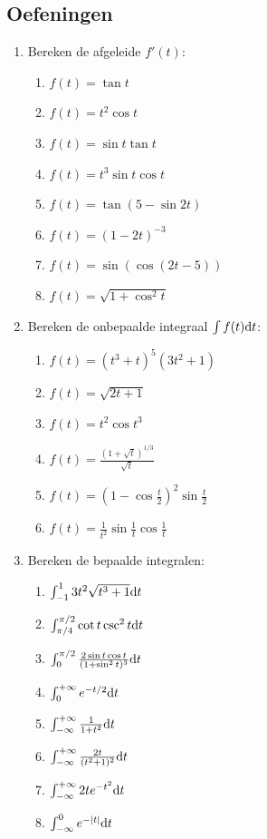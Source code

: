 \subsection{Oefeningen}
\begin{enumerate}
    \item Bereken de afgeleide $f'(t)$:
    \begin{enumerate}
        \item $f(t) = \tan t$
        \item $f(t) = t^2 \cos t$
        \item $f(t) = \sin t \tan t$
        \item $f(t) = t^3 \sin t \cos t$
        \item $f(t) = \tan(5 - \sin 2t)$
        \item $f(t) = (1-2t)^{-3}$
        \item $f(t) = \sin(\cos(2t-5))$
        \item $f(t) = \sqrt{1+\cos^2 t}$
    \end{enumerate}

    \item Bereken de onbepaalde integraal $\int f(t) \mathrm{d} t$:
    \begin{enumerate}
        \item $f(t) = (t^3+t)^5(3t^2+1)$
        \item $f(t) = \sqrt{2t+1}$
        \item $f(t) = t^2 \cos t^3$
        \item $f(t) = \frac{(1+\sqrt{t})^{1/3}}{\sqrt{t}}$
        \item $f(t) = (1-\cos \frac{t}{2})^2 \sin \frac{t}{2}$
        \item $f(t) = \frac{1}{t^2} \sin \frac{1}{t} \cos \frac{1}{t}$
    \end{enumerate}

    \item Bereken de bepaalde integralen:
    \begin{enumerate}
        \item $\int_{-1}^1 3t^2 \sqrt{t^3+1} \mathrm{d} t$
        \item $\int_{\pi/4}^{\pi/2} \cot t \csc^2 t \mathrm{d} t$
        \item $\int_0^{\pi/2} \frac{2\sin t \cos t}{(1+\sin^2 t)^3} \mathrm{d} t$
        \item $\int_0^{+\infty} e^{-t/2} \mathrm{d} t$
        \item $\int_{-\infty}^{+\infty} \frac{1}{1+t^2} \mathrm{d} t$
        \item $\int_{-\infty}^{+\infty} \frac{2t}{(t^2+1)^2} \mathrm{d} t$
        \item $\int_{-\infty}^{+\infty} 2te^{-t^2} \mathrm{d} t$
        \item $\int_{-\infty}^0 e^{-|t|} \mathrm{d} t$
    \end{enumerate}
\end{enumerate}

